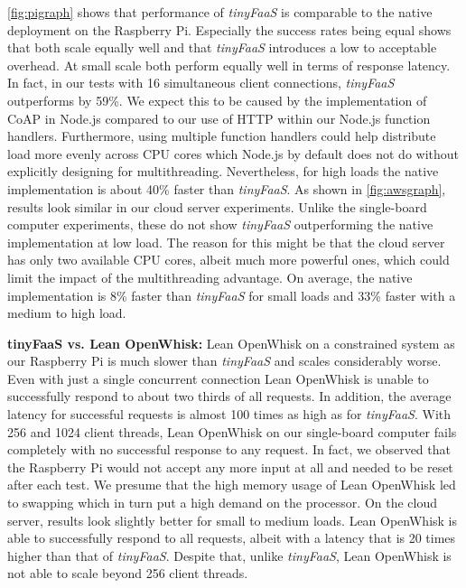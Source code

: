 \cref{fig:pigraph} shows that performance of \textit{tinyFaaS} is comparable to the native deployment on the Raspberry Pi.
Especially the success rates being equal shows that both scale equally well and that \textit{tinyFaaS} introduces a low to acceptable overhead.
At small scale both perform equally well in terms of response latency.
In fact, in our tests with 16 simultaneous client connections, \textit{tinyFaaS} outperforms by 59\%.
We expect this to be caused by the implementation of CoAP in Node.js compared to our use of HTTP within our Node.js function handlers.
Furthermore, using multiple function handlers could help distribute load more evenly across CPU cores which Node.js by default does not do without explicitly designing for multithreading.
Nevertheless, for high loads the native implementation is about 40\% faster than \textit{tinyFaaS}.
As shown in \cref{fig:awsgraph}, results look similar in our cloud server experiments.
Unlike the single-board computer experiments, these do not show \textit{tinyFaaS} outperforming the native implementation at low load.
The reason for this might be that the cloud server has only two available CPU cores, albeit much more powerful ones, which could limit the impact of the multithreading advantage.
On average, the native implementation is 8\% faster than \textit{tinyFaaS} for small loads and 33\% faster with a medium to high load.

\textbf{tinyFaaS vs. Lean OpenWhisk:} Lean OpenWhisk on a constrained system as our Raspberry Pi is much slower than \textit{tinyFaaS} and scales considerably worse.
Even with just a single concurrent connection Lean OpenWhisk is unable to successfully respond to about two thirds of all requests.
In addition, the average latency for successful requests is almost 100 times as high as for \textit{tinyFaaS}.
With 256 and 1024 client threads, Lean OpenWhisk on our single-board computer fails completely with no successful response to any request.
In fact, we observed that the Raspberry Pi would not accept any more input at all and needed to be reset after each test.
We presume that the high memory usage of Lean OpenWhisk led to swapping which in turn put a high demand on the processor.
On the cloud server, results look slightly better for small to medium loads.
Lean OpenWhisk is able to successfully respond to all requests, albeit with a latency that is 20 times higher than that of \textit{tinyFaaS}.
Despite that, unlike \textit{tinyFaaS}, Lean OpenWhisk is not able to scale beyond 256 client threads.

